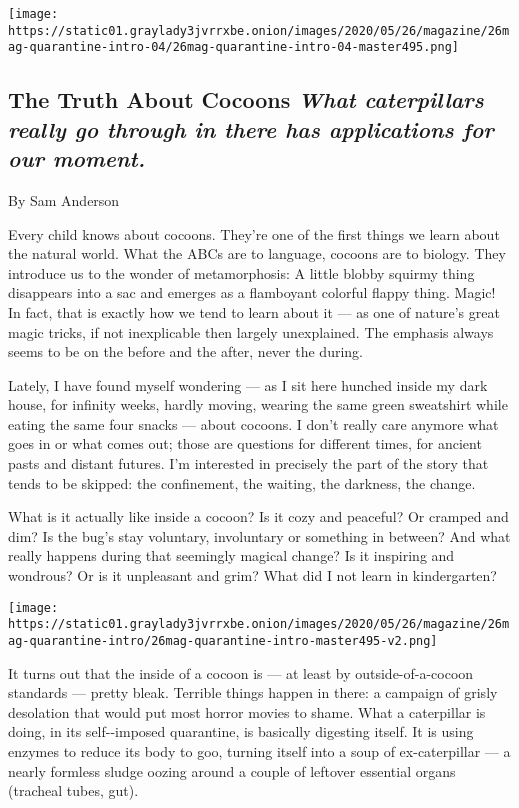 \texttt{[image: https://static01.graylady3jvrrxbe.onion/images/2020/05/26/magazine/26mag-quarantine-intro-04/26mag-quarantine-intro-04-master495.png]}

\hypertarget{the-truth-about-cocoons-what-caterpillars-really-go-through-in-there-has-applications-for-our-moment}{%
\subsection{\texorpdfstring{The Truth About Cocoons \emph{What
caterpillars really go through in there has applications for our
moment.}}{The Truth About Cocoons What caterpillars really go through in there has applications for our moment.}}\label{the-truth-about-cocoons-what-caterpillars-really-go-through-in-there-has-applications-for-our-moment}}

By Sam Anderson

Every child knows about cocoons. They're one of the first things we
learn about the natural world. What the ABCs are to language, cocoons
are to biology. They introduce us to the wonder of metamorphosis: A
little blobby squirmy thing disappears into a sac and emerges as a
flamboyant colorful flappy thing. Magic! In fact, that is exactly how we
tend to learn about it --- as one of nature's great magic tricks, if not
inexplicable then largely unexplained. The emphasis always seems to be
on the before and the after, never the during.

Lately, I have found myself wondering --- as I sit here hunched inside
my dark house, for infinity weeks, hardly moving, wearing the same green
sweatshirt while eating the same four snacks --- about cocoons. I don't
really care anymore what goes in or what comes out; those are questions
for different times, for ancient pasts and distant futures. I'm
interested in precisely the part of the story that tends to be skipped:
the confinement, the waiting, the darkness, the change.

What is it actually like inside a cocoon? Is it cozy and peaceful? Or
cramped and dim? Is the bug's stay voluntary, involuntary or something
in between? And what really happens during that seemingly magical
change? Is it inspiring and wondrous? Or is it unpleasant and grim? What
did I not learn in kindergarten?

\texttt{[image: https://static01.graylady3jvrrxbe.onion/images/2020/05/26/magazine/26mag-quarantine-intro/26mag-quarantine-intro-master495-v2.png]}

It turns out that the inside of a cocoon is --- at least by
outside-of-a-cocoon standards --- pretty bleak. Terrible things happen
in there: a campaign of grisly desolation that would put most horror
movies to shame. What a caterpillar is doing, in its self-\/-imposed
quarantine, is basically digesting itself. It is using enzymes to reduce
its body to goo, turning itself into a soup of ex-caterpillar --- a
nearly formless sludge oozing around a couple of leftover essential
organs (tracheal tubes, gut).

